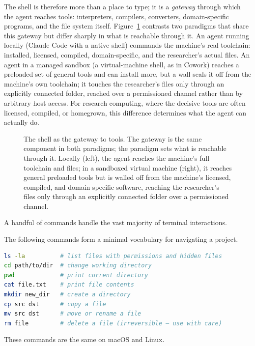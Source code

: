 The shell is therefore more than a place to type; it is a \emph{gateway} through which the agent reaches tools: interpreters, compilers, converters, domain-specific programs, and the file system itself.
Figure~\ref{figure:ShellGateway} contrasts two paradigms that share this gateway but differ sharply in what is reachable through it.
An agent running locally (Claude Code with a native shell) commands the machine's real toolchain: installed, licensed, compiled, domain-specific, and the researcher's actual files.
An agent in a managed sandbox (a virtual-machine shell, as in Cowork) reaches a preloaded set of general tools and can install more, but a wall seals it off from the machine's own toolchain; it touches the researcher's files only through an explicitly connected folder, reached over a permissioned channel rather than by arbitrary host access.
For research computing, where the decisive tools are often licensed, compiled, or homegrown, this difference determines what the agent can actually do.

\begin{figure}[t]
\centering
{\rigfigurefonts}
\caption{The shell as the gateway to tools.
The gateway is the same component in both paradigms; the paradigm sets what is reachable through it.
Locally (left), the agent reaches the machine's full toolchain and files; in a sandboxed virtual machine (right), it reaches general preloaded tools but is walled off from the machine's licensed, compiled, and domain-specific software, reaching the researcher's files only through an explicitly connected folder over a permissioned channel.}
\label{figure:ShellGateway}
\end{figure}

A handful of commands handle the vast majority of terminal interactions.

\begin{example}
The following commands form a minimal vocabulary for navigating a project.
\begin{lstlisting}[language=bash]
ls -la          # list files with permissions and hidden files
cd path/to/dir  # change working directory
pwd             # print current directory
cat file.txt    # print file contents
mkdir new_dir   # create a directory
cp src dst      # copy a file
mv src dst      # move or rename a file
rm file         # delete a file (irreversible — use with care)
\end{lstlisting}
These commands are the same on macOS and Linux.
\end{example}

